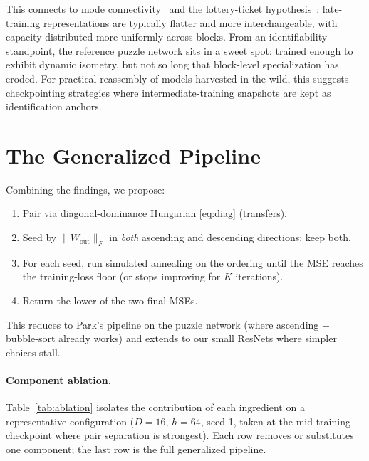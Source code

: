 \documentclass[10pt]{article}
\theoremstyle{remark}
\begin{document}
This connects to mode connectivity~\cite{draxler2018mode} and the
lottery-ticket hypothesis~\cite{frankle2019lottery}: late-training
representations are typically flatter and more interchangeable, with
capacity distributed more uniformly across blocks. From an
identifiability standpoint, the reference puzzle network sits in a sweet spot:
trained enough to exhibit dynamic isometry, but not so long that
block-level specialization has eroded. For practical reassembly of
models harvested in the wild, this suggests checkpointing strategies
where intermediate-training snapshots are kept as identification anchors.

\section{The Generalized Pipeline}\label{sec:pipeline}

Combining the findings, we propose:

\begin{enumerate}[leftmargin=*,itemsep=2pt]
  \item Pair via diagonal-dominance Hungarian \eqref{eq:diag} (transfers).
  \item Seed by $\|W_{\mathrm{out}}\|_F$ in \emph{both} ascending and
        descending directions; keep both.
  \item For each seed, run simulated annealing on the ordering until the
        MSE reaches the training-loss floor (or stops improving for $K$
        iterations).
  \item Return the lower of the two final MSEs.
\end{enumerate}

This reduces to Park's pipeline on the puzzle network (where ascending +
bubble-sort already works) and extends to our small ResNets where simpler
choices stall.

\paragraph{Component ablation.}
Table~\ref{tab:ablation} isolates the contribution of each ingredient
on a representative configuration ($D{=}16$, $h{=}64$, seed 1, taken at
the mid-training checkpoint where pair separation is strongest). Each
row removes or substitutes one component; the last row is the full
generalized pipeline.
\end{document}
